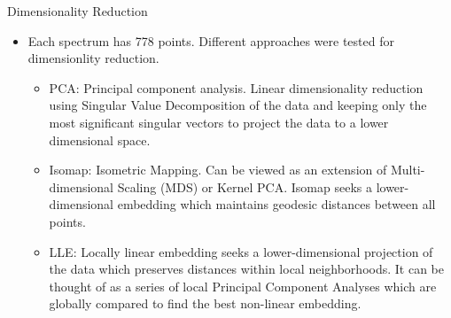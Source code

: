 \documentclass[final,hyperref={pdfpagelabels=false}]{beamer}
\begin{document}
\begin{frame}[t]
\begin{columns}[t]
\begin{column}{.465\textwidth}
\begin{block}{Dimensionality Reduction}
\begin{itemize}
\item Each spectrum has 778 points. Different approaches were tested for dimensionlity reduction.
\begin{itemize}
\item PCA: Principal component analysis. Linear dimensionality reduction using Singular Value Decomposition of the data and keeping only the most significant singular vectors to project the data to a lower dimensional space.
\item Isomap: Isometric Mapping. Can be viewed as an extension of Multi-dimensional Scaling (MDS) or Kernel PCA. Isomap seeks a lower-dimensional embedding which maintains geodesic distances between all points.
\item LLE: Locally linear embedding seeks a lower-dimensional projection of the data which preserves distances within local neighborhoods. It can be thought of as a series of local Principal Component Analyses which are globally compared to find the best non-linear embedding. \cite{scikit-learn}
\end{itemize}
\end{itemize}




\end{block}
\end{column}
\end{columns}
\end{frame}
\end{document}

